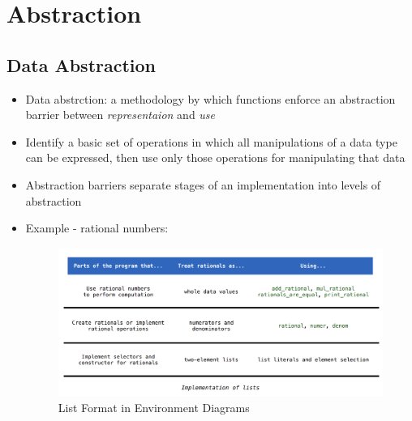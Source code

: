 \chapter{Abstraction}

\section{Data Abstraction}
\begin{itemize}
    \item Data abstrction: a methodology by which functions enforce an abstraction barrier between \emph{representaion} and \emph{use}
    \item Identify a basic set of operations in which all manipulations of a data type can be expressed, then use only those operations for manipulating that data
    \item Abstraction barriers separate stages of an implementation into levels of abstraction
    \item Example - rational numbers:
    \medskip
	\begin{figure}[H]
	\includegraphics[width=1\linewidth]{figures/data_abstraction.png}
	\caption{List Format in Environment Diagrams}
	\end{figure}
\end{itemize}